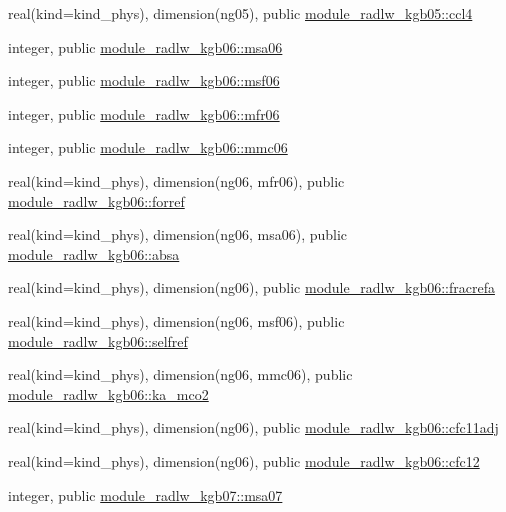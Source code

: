 \begin{DoxyCompactItemize}
\item 
real(kind=kind\+\_\+phys), dimension(ng05), public \hyperlink{group__module__radlw__main_ga15c6b3bfa9d8cbf20099dd4f364444b5}{module\+\_\+radlw\+\_\+kgb05\+::ccl4}
\item 
integer, public \hyperlink{namespacemodule__radlw__kgb06_add7b5d0d3ea44e1e677948c33e870333}{module\+\_\+radlw\+\_\+kgb06\+::msa06}
\item 
integer, public \hyperlink{group__module__radlw__main_ga65f808aeb87457d383dd7f9366878fb9}{module\+\_\+radlw\+\_\+kgb06\+::msf06}
\item 
integer, public \hyperlink{group__module__radlw__main_gaaf1f13cdb5c2888b416a91e8b17e41d8}{module\+\_\+radlw\+\_\+kgb06\+::mfr06}
\item 
integer, public \hyperlink{group__module__radlw__main_gaf7a377cb66fd48348789c20f5a31dec6}{module\+\_\+radlw\+\_\+kgb06\+::mmc06}
\item 
real(kind=kind\+\_\+phys), dimension(ng06, mfr06), public \hyperlink{group__module__radlw__main_ga6a0467b666bc75f90ae58fa4f58f07f0}{module\+\_\+radlw\+\_\+kgb06\+::forref}
\item 
real(kind=kind\+\_\+phys), dimension(ng06, msa06), public \hyperlink{group__module__radlw__main_ga21bd40309855c89a64b88be171bfde59}{module\+\_\+radlw\+\_\+kgb06\+::absa}
\item 
real(kind=kind\+\_\+phys), dimension(ng06), public \hyperlink{group__module__radlw__main_ga1354ecbc5f07cd763847333e680c686a}{module\+\_\+radlw\+\_\+kgb06\+::fracrefa}
\item 
real(kind=kind\+\_\+phys), dimension(ng06, msf06), public \hyperlink{group__module__radlw__main_ga98901725947a4477924a47af5e67277e}{module\+\_\+radlw\+\_\+kgb06\+::selfref}
\item 
real(kind=kind\+\_\+phys), dimension(ng06, mmc06), public \hyperlink{group__module__radlw__main_gadb5dab732383b82e89f1048ab5150c23}{module\+\_\+radlw\+\_\+kgb06\+::ka\+\_\+mco2}
\item 
real(kind=kind\+\_\+phys), dimension(ng06), public \hyperlink{group__module__radlw__main_ga8b0813723ba69b1afbe2552f6b730267}{module\+\_\+radlw\+\_\+kgb06\+::cfc11adj}
\item 
real(kind=kind\+\_\+phys), dimension(ng06), public \hyperlink{group__module__radlw__main_ga44f5934520edc537b5df004774b0ef71}{module\+\_\+radlw\+\_\+kgb06\+::cfc12}
\item 
integer, public \hyperlink{namespacemodule__radlw__kgb07_a0acb84a6b261fc00f1765707844c32f2}{module\+\_\+radlw\+\_\+kgb07\+::msa07}

\end{DoxyCompactItemize}
